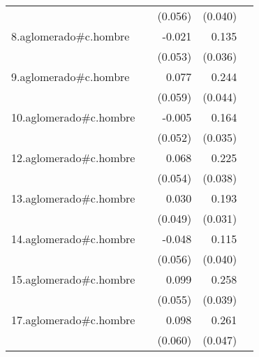 {\begin{longtable}{l*{4}{D{.}{.}{-1}}}
            &                     &     (0.056)         &     (0.040)         &                     \\
\addlinespace
8.aglomerado#c.hombre&                     &      -0.021         &       0.135\sym{***}&                     \\
            &                     &     (0.053)         &     (0.036)         &                     \\
\addlinespace
9.aglomerado#c.hombre&                     &       0.077         &       0.244\sym{***}&                     \\
            &                     &     (0.059)         &     (0.044)         &                     \\
\addlinespace
10.aglomerado#c.hombre&                     &      -0.005         &       0.164\sym{***}&                     \\
            &                     &     (0.052)         &     (0.035)         &                     \\
\addlinespace
12.aglomerado#c.hombre&                     &       0.068         &       0.225\sym{***}&                     \\
            &                     &     (0.054)         &     (0.038)         &                     \\
\addlinespace
13.aglomerado#c.hombre&                     &       0.030         &       0.193\sym{***}&                     \\
            &                     &     (0.049)         &     (0.031)         &                     \\
\addlinespace
14.aglomerado#c.hombre&                     &      -0.048         &       0.115\sym{**} &                     \\
            &                     &     (0.056)         &     (0.040)         &                     \\
\addlinespace
15.aglomerado#c.hombre&                     &       0.099         &       0.258\sym{***}&                     \\
            &                     &     (0.055)         &     (0.039)         &                     \\
\addlinespace
17.aglomerado#c.hombre&                     &       0.098         &       0.261\sym{***}&                     \\
            &                     &     (0.060)         &     (0.047)         &                     \\

\end{longtable}}
